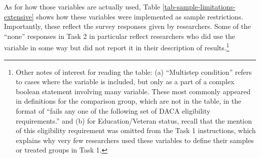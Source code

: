 \documentclass[
  letterpaper,
  DIV=11,
  numbers=noendperiod]{scrartcl}
\begin{document}
\begin{table}[!htbp] \centering \renewcommand*{\arraystretch}{1.1}\caption{Number of Variables Referred to in Sample Limitations}\label{tab-number-of-sample-limitations}
\end{table}

As for how those variables are actually used, Table
\ref{tab-sample-limitations-extensive} shows how these variables were
implemented as sample restrictions. Importantly, these reflect the
survey responses given by researchers. Some of the ``none'' responses in
Task 2 in particular reflect researchers who did use the variable in
some way but did not report it in their description of
results.\footnote{Other notes of interest for reading the table: (a)
  ``Multistep condition'' refers to cases where the variable is
  included, but only as a part of a complex boolean statement involving
  many variable. These most commonly appeared in definitions for the
  comparison group, which are not in the table, in the format of ``fails
  any one of the following set of DACA eligibility requirements.'' and
  (b) for Education/Veteran status, recall that the mention of this
  eligibility requirement was omitted from the Task 1 instructions,
  which explains why very few researchers used these variables to define
  their samples or treated groups in Task 1.}
\end{document}
